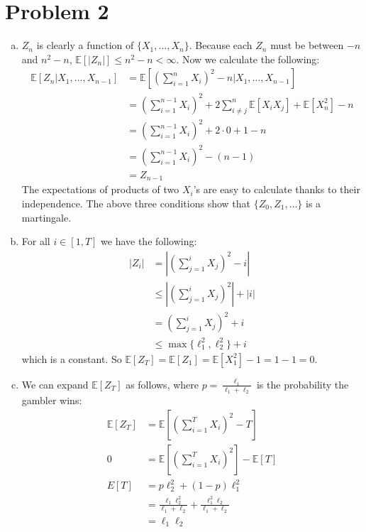 \documentclass[11pt]{article}
\newcommand{\E}{\mathbb{E}}
\begin{document}
\section*{Problem 2}
\begin{enumerate}[(a)]
\item $Z_n$ is clearly a function of $\{X_1,\ldots,X_n\}$. Because each $Z_n$ must be between $-n$ and $n^2-n$, $\E[|Z_n|]\leq n^2-n < \infty$. Now we calculate the following:
\begin{align*}
\E[Z_n|X_1,\ldots,X_{n-1}] &= \E\left[\left(\sum_{i=1}^nX_i\right)^2-n|X_1,\ldots,X_{n-1}\right]\\
&= \left(\sum_{i=1}^{n-1}X_i\right)^2 + 2\sum_{i\neq j}^n\E[X_iX_j] + \E[X_n^2] - n\\
&= \left(\sum_{i=1}^{n-1}X_i\right)^2 + 2\cdot0+1-n\\
&= \left(\sum_{i=1}^{n-1}X_i\right)^2 - (n-1)\\
&= Z_{n-1}
\end{align*}
The expectations of products of two $X_i$'s are easy to calculate thanks to their independence. The above three conditions show that $\{Z_0,Z_1,\ldots\}$ is a martingale.
\item For all $i\in[1,T]$ we have the following:
\begin{align*}
|Z_i| &= \left|\left(\sum_{j=1}^iX_j\right)^2-i\right|\\
&\leq \left|\left(\sum_{j=1}^iX_j\right)^2\right| + |i|\\
&= \left(\sum_{j=1}^iX_j\right)^2 + i\\
&\leq \max\{\ell_1^2,\ell_2^2\} + i
\end{align*}
which is a constant. So $\E[Z_T]=\E[Z_1]=\E[X_1^2]-1=1-1=0$.
\newpage
\item We can expand $\E[Z_T]$ as follows, where $p=\frac{\ell_1}{\ell_1+\ell_2}$ is the probability the gambler wins:
\begin{align*}
\E[Z_T] &= \E\left[\left(\sum_{i=1}^TX_i\right)^2-T\right]\\
0 &= \E\left[\left(\sum_{i=1}^TX_i\right)^2\right]-\E[T]\\
E[T] &= p\ell_2^2 + (1-p)\ell_1^2\\
&= \frac{\ell_1\ell_2^2}{\ell_1+\ell_2}+\frac{\ell_1^2\ell_2}{\ell_1+\ell_2}\\
&= \ell_1\ell_2
\end{align*}
\end{enumerate}
\end{document}

